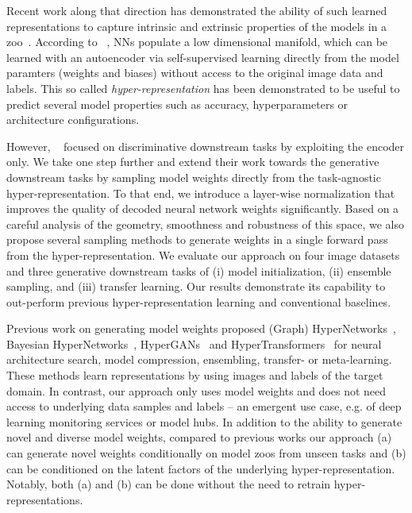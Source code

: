 \documentclass{article}
\begin{document}
Recent work along that direction has demonstrated the ability of such learned representations to capture intrinsic and extrinsic properties of the models in a zoo~\citep{unterthinerPredictingNeuralNetwork2020,
schurholtSelfSupervisedRepresentationLearning2021,martin2021predicting}.
%
According to ~\citep{schurholtSelfSupervisedRepresentationLearning2021}, NNs populate a low dimensional manifold, which can be learned with an autoencoder via self-supervised learning directly from the model paramters (weights and biases)
without access to the original image data and labels. This so called \textit{hyper-representation} has been demonstrated to be useful to predict several model properties such as accuracy, hyperparameters or architecture configurations.

However,  ~\citep{schurholtSelfSupervisedRepresentationLearning2021} focused on discriminative downstream tasks by exploiting the encoder only. We take one step further and extend their work towards the generative downstream tasks by sampling model weights directly from the task-agnostic hyper-representation. 
To that end, we introduce a layer-wise normalization that improves the quality of decoded neural network weights significantly. Based on a careful analysis of the geometry, smoothness and robustness of this space, we also propose several sampling methods to generate weights in a single forward pass from the hyper-representation.
We evaluate our approach on four image datasets and three generative downstream tasks of (i) model initialization, (ii) ensemble sampling, and (iii) transfer learning. Our results demonstrate its capability to out-perform previous hyper-representation learning and conventional baselines.

Previous work on generating model weights proposed (Graph) HyperNetworks~\citep{haHyperNetworks2016,zhangGraphHyperNetworksNeural2019,knyazevParameterPredictionUnseen2021}, Bayesian HyperNetworks~\citep{deutschGeneratingNeuralNetworks2018}, HyperGANs~\citep{ratzlaffHyperGANGenerativeModel2019} and HyperTransformers~\citep{zhmoginovHyperTransformerModelGeneration2022} for neural architecture search, model compression, ensembling, transfer- or meta-learning.
These methods learn representations by using images and labels of the target domain. In contrast, our approach only uses model weights and does not need access to underlying data samples and labels -- 
an emergent use case, e.g. of deep learning monitoring services or model hubs. 
In addition to the ability to generate novel and diverse model weights, compared to previous works our approach (a) can generate novel weights conditionally on model zoos from unseen tasks and (b) can be conditioned on the latent factors of the underlying hyper-representation. Notably, both (a) and (b) can be done without the need to retrain hyper-representations.
\end{document}
